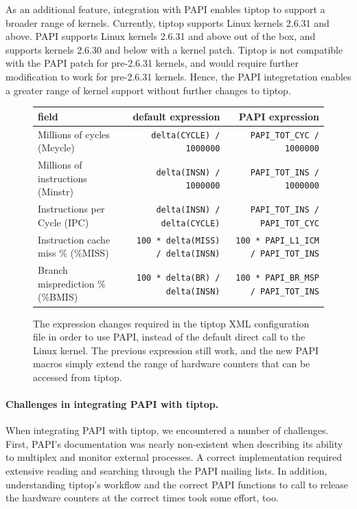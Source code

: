As an additional feature, integration with PAPI enables tiptop to support a broader range of kernels. Currently, tiptop supports Linux kernels 2.6.31 and above.
PAPI supports Linux kernels 2.6.31 and above out of the box, and supports kernels 2.6.30 and below with a kernel patch.
Tiptop is not compatible with the PAPI patch for pre-2.6.31 kernels, and would require further modification to work for pre-2.6.31 kernels.
Hence, the PAPI integretation enables a greater range of kernel support without further changes to tiptop.

\begin{figure}[t]
\footnotesize
\centering
\begin{tabular}{lrr}
\toprule
field & default expression & PAPI expression \\
\midrule
Millions of cycles (Mcycle) & \texttt{delta(CYCLE) / 1000000} & \texttt{PAPI\_TOT\_CYC / 1000000} \\
Millions of instructions (Minstr) & \texttt{delta(INSN) / 1000000} & \texttt{PAPI\_TOT\_INS / 1000000} \\
Instructions per Cycle (IPC) & \texttt{delta(INSN) / delta(CYCLE)} & \texttt{PAPI\_TOT\_INS / PAPI\_TOT\_CYC} \\
Instruction cache miss \% (\%MISS) & \texttt{100 * delta(MISS) / delta(INSN)} & \texttt{100 * PAPI\_L1\_ICM / PAPI\_TOT\_INS} \\
Branch misprediction \% (\%BMIS) & \texttt{100 * delta(BR) / delta(INSN)} & \texttt{100 * PAPI\_BR\_MSP / PAPI\_TOT\_INS} \\
\bottomrule
\end{tabular}
\caption{\footnotesize The expression changes required in the tiptop XML configuration file in order to use PAPI, instead of the default direct call to the Linux kernel. The previous expression still work, and the new PAPI macros simply extend the range of hardware counters that can be accessed from tiptop.}
\label{fig:tiptop-papi-expressions}
\end{figure}

\paragraph{Challenges in integrating PAPI with tiptop.}
When integrating PAPI with tiptop, we encountered a number of challenges.
First, PAPI's documentation was nearly non-existent when describing its ability to multiplex and monitor external processes.
A correct implementation required extensive reading and searching through the PAPI mailing lists.
In addition, understanding tiptop's workflow and the correct PAPI functions to call to release the hardware counters at the correct times took some effort, too.

